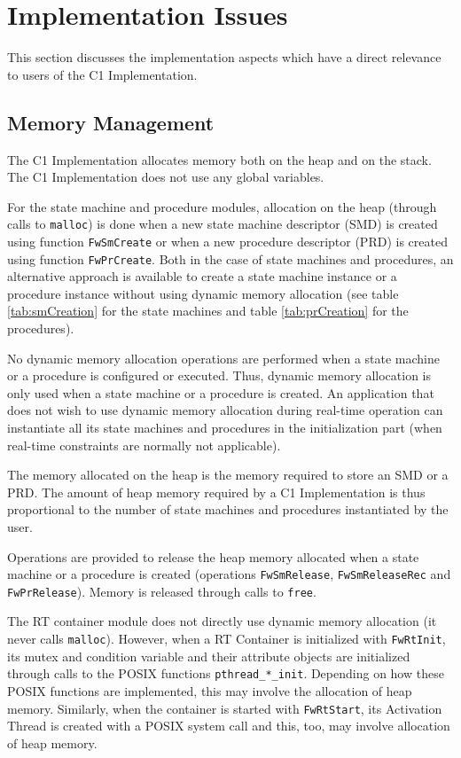 \documentclass[a4paper,10pt]{article}
\let\stdsection\section
\renewcommand\section{\newpage\stdsection}
\begin{document}
\section{Implementation Issues}
This section discusses the implementation aspects which have a direct relevance to users of the C1 Implementation.

\subsection{Memory Management}
The C1 Implementation allocates memory both on the heap and on the stack. The C1 Implementation does not use any global variables.

For the state machine and procedure modules, allocation on the heap (through calls to \texttt{malloc}) is done when a new state machine descriptor (SMD) is created using function \texttt{FwSmCreate} or when a new procedure descriptor (PRD) is created using function \texttt{FwPrCreate}. Both in the case of state machines and procedures, an alternative approach is available to create a state machine instance or a procedure instance without using dynamic memory allocation (see table \ref{tab:smCreation} for the state machines and table \ref{tab:prCreation} for the procedures). 

No dynamic memory allocation operations are performed when a state machine or a procedure is configured or executed. Thus, dynamic memory allocation is only used when a state machine or a procedure is created. An application that does not wish to use dynamic memory allocation during real-time operation can instantiate all its state machines and procedures in the initialization part (when real-time constraints are normally not applicable). 

The memory allocated on the heap is the memory required to store an SMD or a PRD. The amount of heap memory required by a C1 Implementation is thus proportional to the number of state machines and procedures instantiated by the user.

Operations are provided to release the heap memory allocated when a state machine or a procedure is created (operations \texttt{FwSmRelease}, \texttt{FwSmReleaseRec} and \texttt{FwPrRelease}). Memory is released through calls to \texttt{free}.

The RT container module does not directly use dynamic memory allocation (it never calls \texttt{malloc}). However, when a RT Container is initialized with \texttt{FwRtInit}, its mutex and condition variable and their attribute objects are initialized through calls to the POSIX functions \texttt{pthread\_*\_init}. Depending on how these POSIX functions are implemented, this may involve the allocation of heap memory. Similarly, when the container is started with \texttt{FwRtStart}, its Activation Thread is created with a POSIX system call and this, too, may involve allocation of heap memory. 
\end{document}
